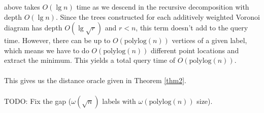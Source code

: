 above takes $O(\lg n)$ time as we descend in the recursive decomposition with depth
$O(\lg n)$. Since the trees constructed for each additively weighted Voronoi diagram has
depth $O(\lg \sqrt{r})$ and $r<n$, this term doesn't add to the query time. However,
there can be up to $O(\text{polylog}(n))$ vertices of a given label, which means we have
to do $O(\text{polylog}(n))$ different point locations and extract the minimum. This
yields a total query time of $O(\text{polylog}(n))$. \\
\\
This gives us the distance oracle given in Theorem \ref{thm2}. \\
\\
TODO: Fix the gap ($\omega(\sqrt{n})$ labels with $\omega(\text{polylog}(n))$ size).
